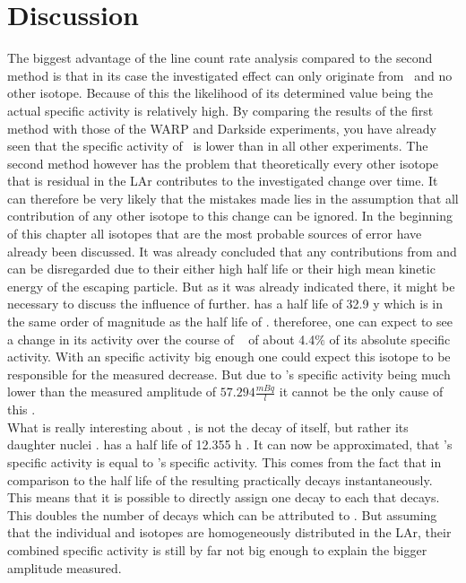 \documentclass[encoding=utf8,british]{tumphthesis}
\begin{document}
\section{Discussion}
\label{Discussion}

The biggest advantage of the line count rate analysis compared to the second method is that in its case the investigated effect can only originate from \Kr\ and no other isotope.
Because of this the likelihood of its determined value being the actual specific activity is relatively high.
By comparing the results of the first method with those of the WARP and Darkside experiments, you have already seen that the specific activity of \Kr\ is lower than in all other experiments.
The second method however has the problem that theoretically every other isotope that is residual in the LAr contributes to the investigated change over time.
It can therefore be very likely that the mistakes made lies in the assumption that all contribution of any other isotope to this change can be ignored. 
In the beginning of this chapter all isotopes that are the most probable sources of error have already been discussed.
It was already concluded that any contributions from  and  can be disregarded due to their either high half life or their high mean kinetic energy of the escaping particle.
But as it was already indicated there, it might be necessary to discuss the influence of  further.
 has a half life of 32.9 y which is in the same order of magnitude as the half life of \Kr.
thereforee, one can expect to see a change in its activity over the course of \PII~ of about 4.4$\%$ of its absolute specific activity.
With an specific activity big enough one could expect this isotope to be responsible for the measured decrease.
But due to 's specific activity being much lower than the measured amplitude of $57.294 \frac{\unit{mBq}}{\unit{l}}$  it cannot be the only cause of this .
\\

What is really interesting about , is not the decay of  itself, but rather its daughter nuclei .
 has a half life of 12.355 h \cite{chen_nuclear_2016}.
It can now be approximated, that 's specific activity is equal to 's specific activity.
This comes from the fact that in comparison to the half life of  the resulting  practically decays instantaneously.
This means that it is possible to directly assign one  decay to each  that decays.
This doubles the number of decays which can be attributed to .
But assuming that the individual  and  isotopes are homogeneously distributed in the LAr, their combined specific activity is still by far not big enough to explain the bigger amplitude measured.
\\
\end{document}
